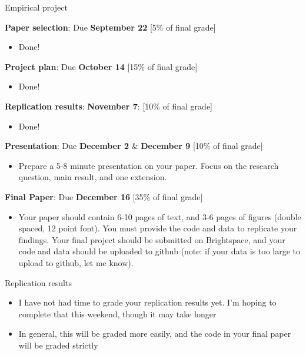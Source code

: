\documentclass[compress, 8pt]{beamer}
\begin{document}
\begin{frame}{Empirical project}

\textbf{Paper selection}: Due \textbf{September 22} [5\% of final grade]
\begin{itemize}
\item Done! 
\end{itemize}

\textbf{Project plan}: Due \textbf{October 14} [15\% of final grade] 
\begin{itemize}
\item Done!
\end{itemize} 

\textbf{Replication results}: \textbf{November 7}: [10\% of final grade]
\begin{itemize}
\item Done! 
\end{itemize}

\textbf{Presentation}: Due \textbf{December 2} \& \textbf{December 9} [10\% of final grade]
\begin{itemize}
\item Prepare a 5-8 minute presentation on your paper. Focus on the research question, main result, and one extension. 
\end{itemize}

\textbf{Final Paper}: Due \textbf{December 16} [35\% of final grade]
\begin{itemize}
\item Your paper should contain 6-10 pages of text, and 3-6 pages of figures (double spaced, 12 point font).
You must provide the code and data to replicate your findings. 
Your final project should be submitted on Brightspace, and your code and data should be uploaded to github (note: if your data is too large to upload to github, let me know). 
\end{itemize}

\end{frame}

\begin{frame}{Replication results}

\begin{itemize}
    \item I have not had time to grade your replication results yet. I'm hoping to complete that this weekend, though it may take longer
    \item In general, this will be graded more easily, and the code in your final paper will be graded strictly
\end{itemize}

\end{frame}
\end{document}
